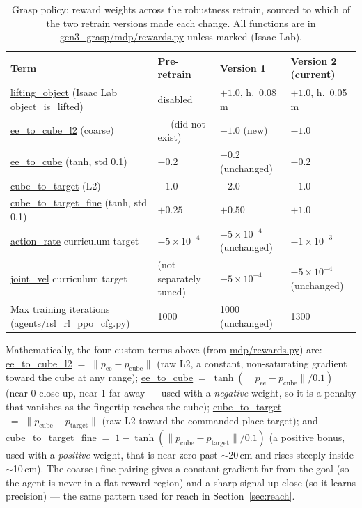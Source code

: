 \documentclass[11pt]{article}
\begin{document}
\begin{table}[h]
\centering
\caption{Grasp policy: reward weights across the robustness retrain, sourced to
which of the two retrain versions made each change. All functions are in
\url{gen3_grasp/mdp/rewards.py} unless marked (Isaac Lab).}
\label{tab:grasp_rewards}
\begin{tabular}{P{4.6cm}P{2.9cm}P{2.9cm}P{2.9cm}}
\toprule
Term & Pre-retrain & Version 1 & Version 2 (current) \\
\midrule
\url{lifting_object} (Isaac Lab \url{object_is_lifted}) & disabled & $+1.0$, h.\ 0.08\,m & $+1.0$, h.\ 0.05\,m \\
\url{ee_to_cube_l2} (coarse) & --- (did not exist) & $-1.0$ (new) & $-1.0$ \\
\url{ee_to_cube} (tanh, std 0.1) & $-0.2$ & $-0.2$ (unchanged) & $-0.2$ \\
\url{cube_to_target} (L2) & $-1.0$ & $-2.0$ & $-1.0$ \\
\url{cube_to_target_fine} (tanh, std 0.1) & $+0.25$ & $+0.50$ & $+1.0$ \\
\url{action_rate} curriculum target & $-5\times10^{-4}$ & $-5\times10^{-4}$ (unchanged) & $-1\times10^{-3}$ \\
\url{joint_vel} curriculum target & (not separately tuned) & $-5\times10^{-4}$ & $-5\times10^{-4}$ (unchanged) \\
Max training iterations (\url{agents/rsl_rl_ppo_cfg.py}) & 1000 & 1000 (unchanged) & 1300 \\
\bottomrule
\end{tabular}
\end{table}

Mathematically, the four custom terms above (from \url{mdp/rewards.py}) are:
\url{ee_to_cube_l2}$\;=\; \lVert p_{\text{ee}}-p_{\text{cube}}\rVert$ (raw L2, a
constant, non-saturating gradient toward the cube at any range);
\url{ee_to_cube}$\;=\;\tanh(\lVert p_{\text{ee}}-p_{\text{cube}}\rVert / 0.1)$
(near 0 close up, near 1 far away --- used with a \emph{negative} weight, so it is a
penalty that vanishes as the fingertip reaches the cube);
\url{cube_to_target}$\;=\;\lVert p_{\text{cube}}-p_{\text{target}}\rVert$ (raw L2
toward the commanded place target); and
\url{cube_to_target_fine}$\;=\;1-\tanh(\lVert p_{\text{cube}}-p_{\text{target}}\rVert / 0.1)$
(a positive bonus, used with a \emph{positive} weight, that is near zero past
$\sim$20\,cm and rises steeply inside $\sim$10\,cm). The coarse+fine pairing gives a
constant gradient far from the goal (so the agent is never in a flat reward region)
and a sharp signal up close (so it learns precision) --- the same pattern used for
reach in Section~\ref{sec:reach}.
\end{document}
